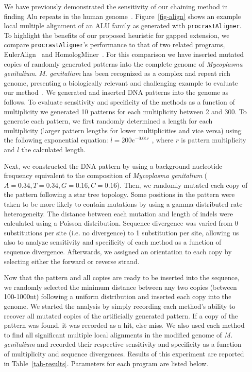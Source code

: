 \documentclass{ws-procs9x6}
\begin{document}
We have previously demonstrated the sensitivity of our chaining method in finding Alu repeats in
the human genome~\cite{ref-procrast}. Figure~\ref{fig-align} shows an example local multiple alignment of an ALU family as generated with \texttt{procrastAligner}. To highlight the benefits of our proposed heuristic for gapped extension, we compare \texttt{procrastAligner}'s performance to that of two related programs, EulerAlign~\cite{ref-related1} and HomologMiner~\cite{ref-homologminer}. For this comparison we have inserted mutated copies of randomly generated patterns into the complete genome of \emph{Mycoplasma genitalium}. \emph{M. genitalium} has been recognized as a complex and repeat rich genome, presenting a biologically relevant and challenging example to evaluate our method~\cite{ref-mycoplasma}. We generated and inserted DNA patterns into the genome as follows. To evaluate sensitivity and specificity of the methods as a function of multiplicity we generated 10 patterns for each multiplicity between 2 and 300. To generate each pattern, we first randomly determined a length for each multiplicity (larger pattern lengths for lower multiplicities and vice versa) using the following exponential equation: $l = 200e^{-0.01r}$ , where $r$ is pattern multiplicity and $l$ the calculated length.

Next, we constructed the DNA pattern by using a background nucleotide frequency equivalent to the composition of \emph{Mycoplasma genitalium} ($A=0.34,T=0.34,G=0.16,C=0.16$). Then, we randomly mutated each copy of the pattern following a star tree topology. Some positions in the pattern were taken to be more likely to contain mutations by using a gamma-distributed rate heterogeneity. The distance between each mutation and length of indels were calculated using a Poisson distribution. Sequence divergence was varied from 0 substitutions per site (i.e. no divergence) to 1 substitution per site, allowing us also to analyze sensitivity and specificity of each method as a function of sequence divergence. Afterwards, we assigned an orientation to each copy by selecting either the forward or reverse strand.

Now that the pattern and all copies are ready to be inserted into the sequence, we randomly selected the minimum distance between any two copies (between 100-1000nt) following a uniform distribution and inserted each copy into the genome.  We started the analysis by simply recording each method's ability to recover all mutated copies of the  artificially generated pattern. If a copy of the pattern was found, it was recorded as a hit, else miss. We also used each method to find all significant multiple local alignments in the modified genome of \emph{M. genitalium} and recorded their respective sensitivity and specificity as a function of multiplicity and sequence divergences. Results of this experiment are reported in Table~\ref{tab-results}. Parameters for each program are listed below.
\end{document}
